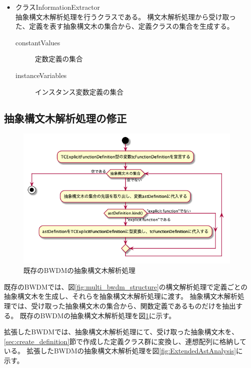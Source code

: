 \documentclass[uplatex, report, a4j, 10pt]{jsbook}
\begin{document}
\begin{itemize}
  \item クラスInformationExtractor\\
        抽象構文木解析処理を行うクラスである。
        構文木解析処理から受け取った、定義を表す抽象構文木の集合から、定義クラスの集合を生成する。
        \begin{description}
          \item[constantValues] 定数定義の集合
          \item[instanceVariables] インスタンス変数定義の集合
        \end{description}

\end{itemize}

\subsection{抽象構文木解析処理の修正}
\begin{figure}[tp]
  \centering
  \includegraphics[keepaspectratio, width=160mm]{figs/ExistAstAnalysis}
  \caption{既存のBWDMの抽象構文木解析処理}
  \label{fig:ExistAstAnalysis}
\end{figure}

既存のBWDMでは、図\ref{fig:multi_bwdm_structure}の構文解析処理で定義ごとの抽象構文木を生成し、それらを抽象構文木解析処理に渡す。
抽象構文木解析処理では、受け取った抽象構文木の集合から、関数定義であるものだけを抽出する。
既存のBWDMの抽象構文木解析処理を図\ref{fig:ExistAstAnalysis}に示す。

拡張したBWDMでは、抽象構文木解析処理にて、受け取った抽象構文木を、\ref{sec:create_definition}節で作成した定義クラス群に変換し、連想配列に格納している。
拡張したBWDMの抽象構文木解析処理を図\ref{fig:ExtendedAstAnalysis}に示す。
\end{document}
